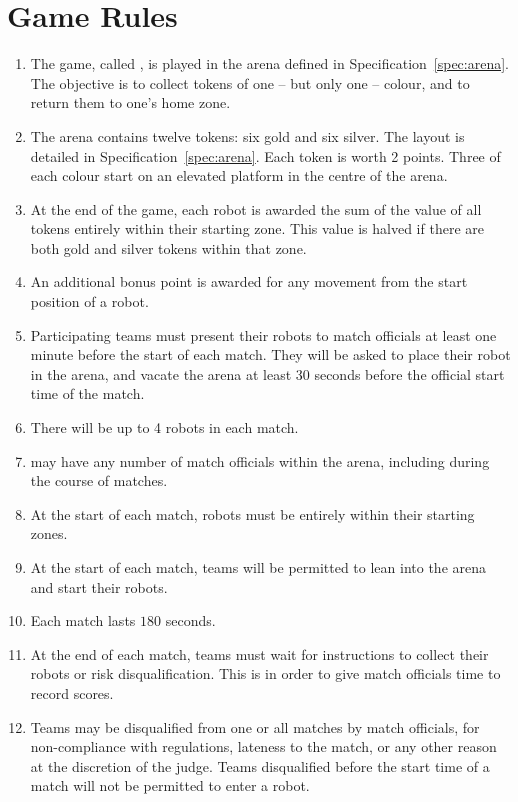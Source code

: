 \section{Game Rules}
\label{sec:rules}

\begin{enumerate}
  \item The game, called \emph{\gamename}, is played in the arena defined in
        Specification~\ref{spec:arena}. The objective is to collect tokens of
        one -- but only one -- colour, and to return them to one's home zone.
  \item The arena contains twelve tokens: six gold and six silver. The layout
        is detailed in Specification~\ref{spec:arena}. Each token is worth 2
        points. Three of each colour start on an elevated platform in the centre
        of the arena.
  \item At the end of the game, each robot is awarded the sum of the value of
        all tokens entirely within their starting zone. This value is halved
        if there are both gold and silver tokens within that zone.
  \item An additional bonus point is awarded for any movement from the start
        position of a robot.
  \item Participating teams must present their robots to match officials at
        least one minute before the start of each match. They will be asked to
        place their robot in the arena, and vacate the arena at least 30 seconds
        before the official start time of the match.
  \item There will be up to 4 robots in each match.
  \item \org may have any number of match officials within the arena, including
        during the course of matches.
  \item At the start of each match, robots must be entirely within their
        starting zones.
  \item At the start of each match, teams will be permitted to lean into the
        arena and start their robots.
  \item Each match lasts $180$ seconds.
  \item At the end of each match, teams must wait for instructions to collect
        their robots or risk disqualification. This is in order to give match
        officials time to record scores.
  \item Teams may be disqualified from one or all matches by match officials,
        for non-compliance with regulations, lateness to the match, or any other
        reason at the discretion of the judge. Teams disqualified before the
        start time of a match will not be permitted to enter a robot.
\end{enumerate}

